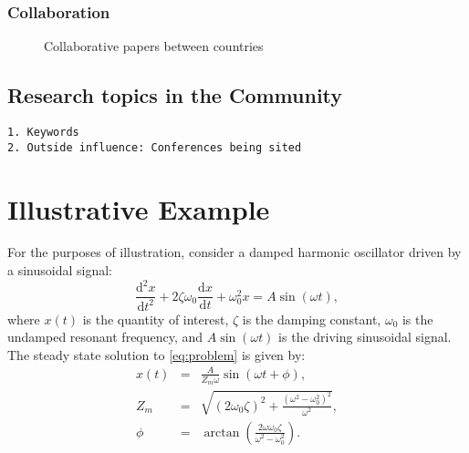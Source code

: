 \documentclass[journal,twocolumn]{IEEEtran}
\begin{document}
    \hypertarget{collaboration}{%
\subsubsection{Collaboration}\label{collaboration}}


    \begin{figure}
        \begin{center}\end{center}
        \caption{Collaborative papers between countries}
        \label{figcollab}
    \end{figure}
    
    \hypertarget{research-topics-in-the-community}{%
\subsection{Research topics in the
Community}\label{research-topics-in-the-community}}

\begin{verbatim}
1. Keywords
2. Outside influence: Conferences being sited
\end{verbatim}

    \hypertarget{illustrative-example}{%
\section{Illustrative Example}\label{illustrative-example}}

For the purposes of illustration, consider a damped harmonic oscillator
driven by a sinusoidal signal: \begin{equation}
\frac{\mathrm{d}^2x}{\mathrm{d}t^2} + 2\zeta\omega_0\frac{\mathrm{d}x}{\mathrm{d}t} + \omega_0^2x = A\sin(\omega t), \label{eq:problem}
\end{equation} \noindent where \(x(t)\) is the quantity of interest,
\(\zeta\) is the damping constant, \(\omega_0\) is the undamped resonant
frequency, and \(A\sin(\omega t)\) is the driving sinusoidal signal. The
steady state solution to \eqref{eq:problem} is given by:
\begin{eqnarray}
x(t) &=& \frac{A}{Z_m\omega}\sin(\omega t + \phi), \label{eq:soln}\\
Z_m &=& \sqrt{(2\omega_0\zeta)^2+\frac{(\omega^2-\omega_0^2)^2}{\omega^2}}, \nonumber\\
\phi &=& \arctan\left(\frac{2\omega\omega_0\zeta}{\omega^2-\omega_0^2}\right). \nonumber
\end{eqnarray}
\end{document}
